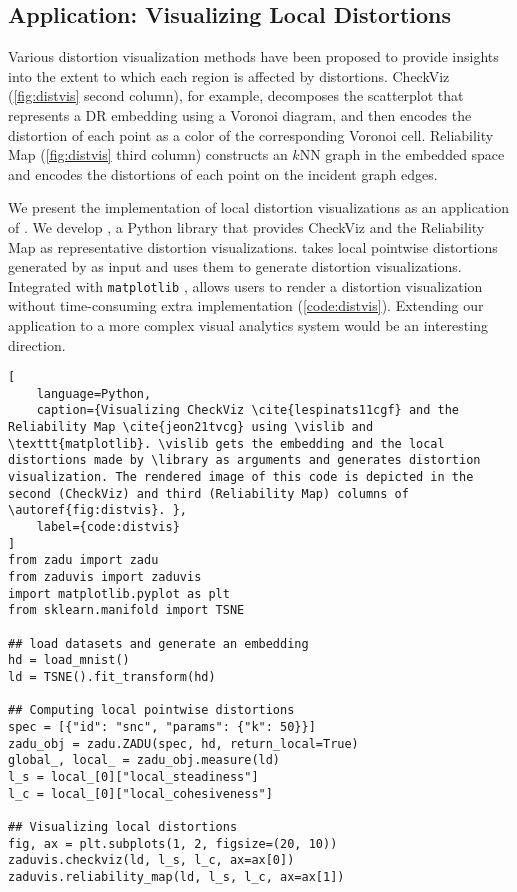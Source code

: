 
\subsection{Application: Visualizing Local Distortions}

\label{sec:app}

Various distortion visualization methods \cite{lespinats11cgf, jeon21tvcg} have been proposed to provide insights into the extent to which each region is affected by distortions.
CheckViz \cite{lespinats11cgf} (\autoref{fig:distvis} second column), for example, decomposes the scatterplot that represents a DR embedding using a Voronoi diagram, and then encodes the distortion of each point as a color of the corresponding Voronoi cell. Reliability Map \cite{jeon21tvcg} (\autoref{fig:distvis} third column) constructs an  $k$NN graph in the embedded space and encodes the distortions of each point on the incident graph edges. 


We present the implementation of local distortion visualizations as an application of \library. We develop \vislib, a Python library that provides CheckViz and the Reliability Map as representative distortion visualizations. 
\vislib takes local pointwise distortions generated by \library as input and uses them to generate distortion visualizations. 
Integrated with \texttt{matplotlib} \cite{hunter07cse}, \vislib allows users to render a distortion visualization without time-consuming extra implementation (\autoref{code:distvis}). Extending our application to a more complex visual analytics system would be an interesting direction.



\begin{lstlisting}[
    language=Python, 
    caption={Visualizing CheckViz \cite{lespinats11cgf} and the Reliability Map \cite{jeon21tvcg} using \vislib and \texttt{matplotlib}. \vislib gets the embedding and the local distortions made by \library as arguments and generates distortion visualization. The rendered image of this code is depicted in the second (CheckViz) and third (Reliability Map) columns of \autoref{fig:distvis}. },
    label={code:distvis}
]
from zadu import zadu
from zaduvis import zaduvis
import matplotlib.pyplot as plt
from sklearn.manifold import TSNE

## load datasets and generate an embedding
hd = load_mnist()
ld = TSNE().fit_transform(hd)

## Computing local pointwise distortions
spec = [{"id": "snc", "params": {"k": 50}}]
zadu_obj = zadu.ZADU(spec, hd, return_local=True)
global_, local_ = zadu_obj.measure(ld)
l_s = local_[0]["local_steadiness"]
l_c = local_[0]["local_cohesiveness"]

## Visualizing local distortions
fig, ax = plt.subplots(1, 2, figsize=(20, 10))
zaduvis.checkviz(ld, l_s, l_c, ax=ax[0])
zaduvis.reliability_map(ld, l_s, l_c, ax=ax[1])


\end{lstlisting}
